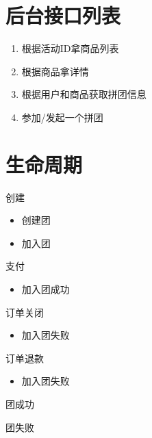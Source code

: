 \documentclass[presentation, bigger]{beamer}
\begin{document}
\section{后台接口列表}
\label{sec:orgheadline6}
\begin{enumerate}
\item 根据活动ID拿商品列表
\item 根据商品拿详情
\item 根据用户和商品获取拼团信息
\item 参加/发起一个拼团
\end{enumerate}

\section{生命周期}
\label{sec:orgheadline13}

\begin{frame}[label={sec:orgheadline7}]{创建}
\begin{itemize}
\item 创建团
\item 加入团
\end{itemize}
\end{frame}

\begin{frame}[label={sec:orgheadline8}]{支付}
\begin{itemize}
\item 加入团成功
\end{itemize}
\end{frame}

\begin{frame}[label={sec:orgheadline9}]{订单关闭}
\begin{itemize}
\item 加入团失败
\end{itemize}
\end{frame}

\begin{frame}[label={sec:orgheadline10}]{订单退款}
\begin{itemize}
\item 加入团失败
\end{itemize}
\end{frame}

\begin{frame}[label={sec:orgheadline11}]{团成功}
\end{frame}

\begin{frame}[label={sec:orgheadline12}]{团失败}
\end{frame}
\end{document}
